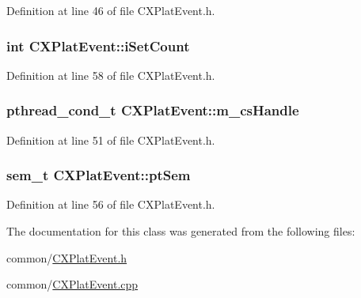 \-Definition at line 46 of file \-C\-X\-Plat\-Event.\-h.

\hypertarget{class_c_x_plat_event_aad997af175335943b6eea0ba9f870df6}{
\subsubsection[{i\-Set\-Count}]{\setlength{\rightskip}{0pt plus 5cm}int {\bf \-C\-X\-Plat\-Event\-::i\-Set\-Count}}}\label{class_c_x_plat_event_aad997af175335943b6eea0ba9f870df6}


\-Definition at line 58 of file \-C\-X\-Plat\-Event.\-h.

\hypertarget{class_c_x_plat_event_ad452214355d4b5989c30ed1e7f137544}{
\subsubsection[{m\-\_\-cs\-Handle}]{\setlength{\rightskip}{0pt plus 5cm}pthread\-\_\-cond\-\_\-t {\bf \-C\-X\-Plat\-Event\-::m\-\_\-cs\-Handle}}}\label{class_c_x_plat_event_ad452214355d4b5989c30ed1e7f137544}


\-Definition at line 51 of file \-C\-X\-Plat\-Event.\-h.

\hypertarget{class_c_x_plat_event_aebee3d1cc992443887951cd69642de35}{
\subsubsection[{pt\-Sem}]{\setlength{\rightskip}{0pt plus 5cm}sem\-\_\-t {\bf \-C\-X\-Plat\-Event\-::pt\-Sem}}}\label{class_c_x_plat_event_aebee3d1cc992443887951cd69642de35}


\-Definition at line 56 of file \-C\-X\-Plat\-Event.\-h.



\-The documentation for this class was generated from the following files\-:\begin{DoxyCompactItemize}
\item 
common/\hyperlink{_c_x_plat_event_8h}{\-C\-X\-Plat\-Event.\-h}\item 
common/\hyperlink{_c_x_plat_event_8cpp}{\-C\-X\-Plat\-Event.\-cpp}\end{DoxyCompactItemize}
